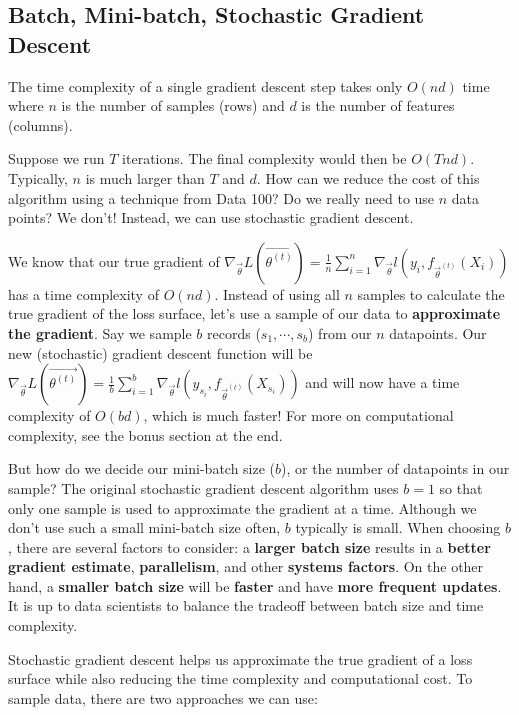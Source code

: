 \documentclass[
  letterpaper,
  DIV=11,
  numbers=noendperiod]{scrreprt}
\begin{document}
\subsection{Batch, Mini-batch, Stochastic Gradient
Descent}\label{batch-mini-batch-stochastic-gradient-descent}

The time complexity of a single gradient descent step takes only
\(O(nd)\) time where \(n\) is the number of samples (rows) and \(d\) is
the number of features (columns).

Suppose we run \(T\) iterations. The final complexity would then be
\(O(Tnd)\). Typically, \(n\) is much larger than \(T\) and \(d\). How
can we reduce the cost of this algorithm using a technique from Data
100? Do we really need to use \(n\) data points? We don't! Instead, we
can use stochastic gradient descent.

We know that our true gradient of
\(\nabla_{\vec{\theta}} L (\vec{\theta^{(t)}}) = \frac{1}{n}\sum_{i=1}^{n}\nabla_{\vec{\theta}} l(y_i, f_{\vec{\theta}^{(t)}}(X_i))\)
has a time complexity of \(O(nd)\). Instead of using all \(n\) samples
to calculate the true gradient of the loss surface, let's use a sample
of our data to \textbf{approximate the gradient}. Say we sample \(b\)
records (\(s_1, \cdots, s_b\)) from our \(n\) datapoints. Our new
(stochastic) gradient descent function will be
\(\nabla_{\vec{\theta}} L (\vec{\theta^{(t)}}) = \frac{1}{b}\sum_{i=1}^{b}\nabla_{\vec{\theta}} l(y_{s_i}, f_{\vec{\theta}^{(t)}}(X_{s_i}))\)
and will now have a time complexity of \(O(bd)\), which is much faster!
For more on computational complexity, see the bonus section at the end.

But how do we decide our mini-batch size (\(b\)), or the number of
datapoints in our sample? The original stochastic gradient descent
algorithm uses \(b=1\) so that only one sample is used to approximate
the gradient at a time. Although we don't use such a small mini-batch
size often, \(b\) typically is small. When choosing \(b\), there are
several factors to consider: a \textbf{larger batch size} results in a
\textbf{better gradient estimate}, \textbf{parallelism}, and other
\textbf{systems factors}. On the other hand, a \textbf{smaller batch
size} will be \textbf{faster} and have \textbf{more frequent updates}.
It is up to data scientists to balance the tradeoff between batch size
and time complexity.

Stochastic gradient descent helps us approximate the true gradient of a
loss surface while also reducing the time complexity and computational
cost. To sample data, there are two approaches we can use:
\end{document}
